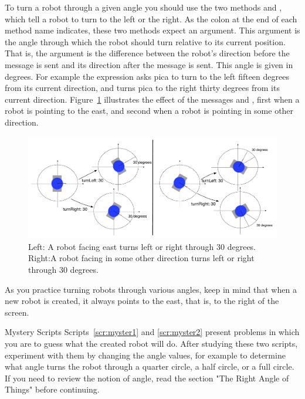 \documentclass[a4paper,10pt,twoside]{book}
\begin{document}
To turn a robot through a given angle you should use the two methods  and 
, which tell a robot to turn to the left or the right. As the colon at the end of each 
method name indicates, these two methods expect an argument. This argument is the angle 
through which the robot should turn relative to its current position. That is, the argument is 
the difference between the robot’s direction before the message is sent and its direction after 
the message is sent. This angle is given in degrees. For example the expression  
asks pica to turn to the left fifteen degrees from its current direction, and  
turns pica to the right thirty degrees from its current direction. Figure~\ref{fig:turnLeftBoth} illustrates the effect of the messages  and , first when a robot is pointing to the east, and second when a robot is pointing in some other direction. 

\begin{figure}
\begin{center}\includegraphics[width=12cm]{turnLeftBoth}
\caption{Left: A robot facing east turns left or right through 30 degrees. Right:A robot facing in 
some other direction turns left or right through 30 degrees.  \label{fig:turnLeftBoth}}
\end{center}
\end{figure}

As you practice turning robots through various angles, keep in mind that when a new 
robot is created, it always points to the east, that is, to the right of the screen. 





\begin{exonofig}{Mystery Scripts}
Scripts~\ref{scr:myster1} and \ref{scr:myster2} present problems in which you are to guess what the created robot will do. After studying these two scripts, experiment with them by changing the angle values, for example to determine what angle turns the robot through a quarter circle, a half circle, or a full circle. If you need to review the notion of angle, read the section "The Right Angle of Things" before continuing. 
\end{exonofig}
\end{document}
